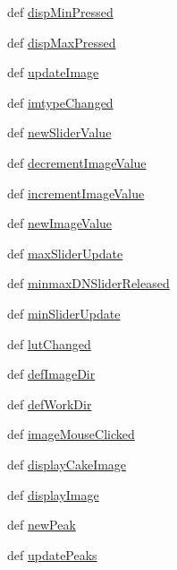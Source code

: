 \begin{DoxyCompactItemize}
\item 
def \hyperlink{class_atrex_1_1_atrex_a64c7ac662276466211b6d02b2ad9d430}{disp\-Min\-Pressed}
\item 
def \hyperlink{class_atrex_1_1_atrex_add0fa0a0b9345510d0cf8d834e3734dd}{disp\-Max\-Pressed}
\item 
def \hyperlink{class_atrex_1_1_atrex_a2b706eddbe63823363f801bb0878eb44}{update\-Image}
\item 
def \hyperlink{class_atrex_1_1_atrex_aa8435a0f0357634c9180d2fd4aa5ce75}{imtype\-Changed}
\item 
def \hyperlink{class_atrex_1_1_atrex_ada591cc2d1c26152ddbaf72f7f7efc4c}{new\-Slider\-Value}
\item 
def \hyperlink{class_atrex_1_1_atrex_a9db0c9087a9c3adbb07b2e887322941e}{decrement\-Image\-Value}
\item 
def \hyperlink{class_atrex_1_1_atrex_aa766d95d2be1bd5b466da0a2581ca0e5}{increment\-Image\-Value}
\item 
def \hyperlink{class_atrex_1_1_atrex_acd608751b80f2f6e38b8e3a3c804aba6}{new\-Image\-Value}
\item 
def \hyperlink{class_atrex_1_1_atrex_ae474912922a15f4c46cfa4b81c6428d4}{max\-Slider\-Update}
\item 
def \hyperlink{class_atrex_1_1_atrex_ada41f153ca507e3f48294d042e991a79}{minmax\-D\-N\-Slider\-Released}
\item 
def \hyperlink{class_atrex_1_1_atrex_aec14907b3f14a48f9805194cd196b67c}{min\-Slider\-Update}
\item 
def \hyperlink{class_atrex_1_1_atrex_aae57dd8400942b0f992b4c4bc868da64}{lut\-Changed}
\item 
def \hyperlink{class_atrex_1_1_atrex_af3b9d9a660caa590a68da51656d622fb}{def\-Image\-Dir}
\item 
def \hyperlink{class_atrex_1_1_atrex_aca19dbda20686dcaef166d9680528e21}{def\-Work\-Dir}
\item 
def \hyperlink{class_atrex_1_1_atrex_ac995f1abf16ed66fea8a907373ff9475}{image\-Mouse\-Clicked}
\item 
def \hyperlink{class_atrex_1_1_atrex_adc2b173f9b80955c6f4fc7a156e9d091}{display\-Cake\-Image}
\item 
def \hyperlink{class_atrex_1_1_atrex_abfe78ab11ed54f2e83bb9fddfb16a573}{display\-Image}
\item 
def \hyperlink{class_atrex_1_1_atrex_a101abfd070fc8f268fb07c79026d778e}{new\-Peak}
\item 
def \hyperlink{class_atrex_1_1_atrex_a8778bbe32534eadb568016f2de735ef2}{update\-Peaks}

\end{DoxyCompactItemize}
